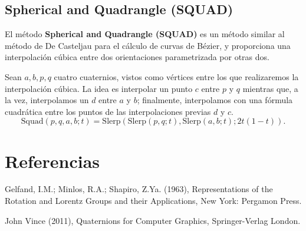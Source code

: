 \documentclass{article}
\theoremstyle{plain}
\theoremstyle{definition}
\theoremstyle{remark}
\begin{document}

\subsection{Spherical and Quadrangle (SQUAD)}

El método \textbf{Spherical and Quadrangle (SQUAD)} es un método
similar al método de De Casteljau para el cálculo de curvas de Bézier,
y proporciona una interpolación cúbica entre dos orientaciones
parametrizada por otras dos.

Sean $a,b,p,q$ cuatro cuaternios, vistos como vértices entre los que
realizaremos la interpolación cúbica. La idea es interpolar un punto
$c$ entre $p$ y $q$ mientras que, a la vez, interpolamos un $d$ entre
$a$ y $b$; finalmente, interpolamos con una fórmula cuadrática entre
los puntos de las interpolaciones previas $d$ y $c$.
\[
  \mathrm{Squad}(p,q,a,b;t) =
  \mathrm{Slerp}(\mathrm{Slerp}(p,q;t), \mathrm{Slerp}(a,b;t); 2t(1-t)).
\]


\section{Referencias}

\begin{thebibliography}{9}

  Gelfand, I.M.; Minlos, R.A.; Shapiro, Z.Ya. (1963),
  Representations of the Rotation and Lorentz Groups and their Applications,
  New York: Pergamon Press.

  John Vince (2011),
  Quaternions for Computer Graphics,
  Springer-Verlag London.

\end{thebibliography}
\end{document}
